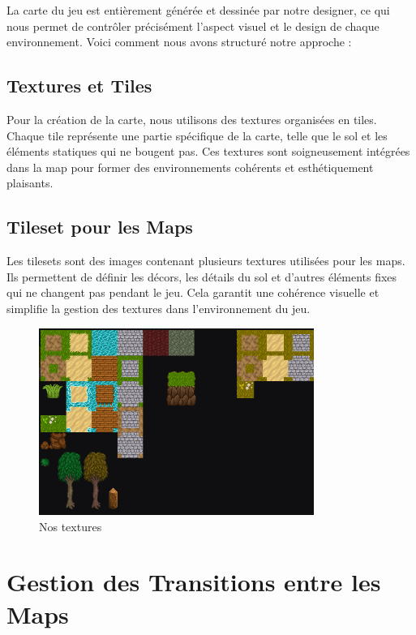 La carte du jeu est entièrement générée et dessinée par notre designer, ce qui nous permet de contrôler précisément 
l'aspect visuel et le design de chaque environnement.
 Voici comment nous avons structuré notre approche :

\subsection*{Textures et Tiles}

Pour la création de la carte, nous utilisons des textures organisées en tiles. 
Chaque tile représente une partie spécifique de la carte, telle que le sol et les éléments statiques qui ne bougent pas.
 Ces textures sont soigneusement intégrées dans la map pour former des environnements cohérents et esthétiquement plaisants.

\subsection*{Tileset pour les Maps}

Les tilesets sont des images contenant plusieurs textures utilisées pour les maps. Ils permettent de définir les décors,
 les détails du sol et d'autres éléments fixes qui ne changent pas pendant le jeu. Cela garantit une cohérence visuelle et simplifie
  la gestion des textures dans l'environnement du jeu.


  \begin{figure}[H]
      \centering
      \includegraphics[width=0.8\textwidth]{assets/tileset.png}
      \caption{Nos textures}
      \label{fig:website1}
  \end{figure}

\section*{Gestion des Transitions entre les Maps}


